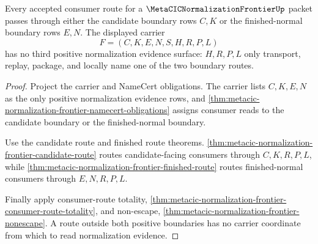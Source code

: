 \begin{theorem}
\label{thm:metacic-normalization-frontier-candidate-finished-boundary-totality}
Every accepted consumer route for a $\MetaCICNormalizationFrontierUp$ packet
passes through either the candidate boundary rows $C,K$ or the
finished-normal boundary rows $E,N$. The displayed carrier
$$
F=(C,K,E,N,S,H,R,P,L)
$$
has no third positive normalization evidence surface: $H,R,P,L$ only
transport, replay, package, and locally name one of the two boundary routes.
\end{theorem}
\begin{proof}
Project the carrier and NameCert obligations. The carrier lists $C,K,E,N$ as
the only positive normalization evidence rows, and
\autoref{thm:metacic-normalization-frontier-namecert-obligations} assigns
consumer reads to the candidate boundary or the finished-normal boundary.

Use the candidate route and finished route theorems.
\autoref{thm:metacic-normalization-frontier-candidate-route} routes
candidate-facing consumers through $C,K,R,P,L$, while
\autoref{thm:metacic-normalization-frontier-finished-route} routes
finished-normal consumers through $E,N,R,P,L$.

Finally apply consumer-route totality,
\autoref{thm:metacic-normalization-frontier-consumer-route-totality}, and
non-escape, \autoref{thm:metacic-normalization-frontier-nonescape}. A route
outside both positive boundaries has no carrier coordinate from which to read
normalization evidence.
\end{proof}

